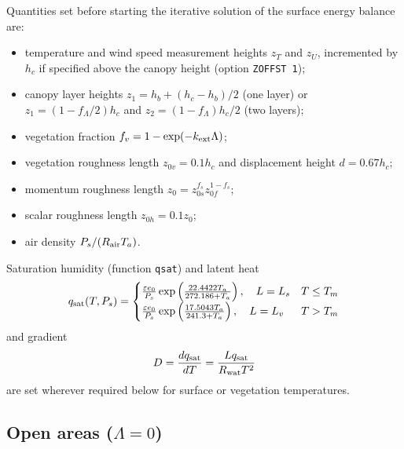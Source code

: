 \documentclass[fleqn]{article}
\begin{document}
Quantities set before starting the iterative solution of the surface energy balance are:
\begin{itemize}[leftmargin=*]
\item temperature and wind speed measurement heights $z_T$ and $z_U$, incremented by $h_c$ if specified above the canopy height (option {\tt ZOFFST 1});
\item canopy layer heights $z_1 = h_b + (h_c-h_b)/2$ (one layer) or $z_1 = (1 - f_\Lambda/2)h_c$ and $z_2 = (1 - f_\Lambda)h_c/2$ (two layers);
\item vegetation fraction $f_v = 1 - \exp(-k_{\rm ext}\Lambda)$;
\item vegetation roughness length $z_{0v} = 0.1h_c$ and displacement height $d = 0.67h_c$; 
\item momentum roughness length $z_0 = z_{0s}^{f_s}z_{0f}^{1-f_s}$;
\item scalar roughness length $z_{0h} = 0.1z_0$;
\item air density $P_s/(R_{\rm air}T_a)$.
\end{itemize}
Saturation humidity (function {\tt qsat}) and latent heat
\begin{equation}
q_{\rm sat}(T,P_s) = 
\begin{cases}
     \frac{\varepsilon e_0}{P_s}\exp\left(\frac{22.4422T_a}{272.186 + T_a}\right), \quad L = L_s   & T \leq T_m \\
     \frac{\varepsilon e_0}{P_s}\exp\left(\frac{17.5043T_a}{241.3 + T_a}\right), \quad L = L_v  & T > T_m  \\
\end{cases}
\end{equation}
and gradient 
\begin{equation}
D = \frac{dq_{\rm sat}}{dT} = \frac{Lq_{\rm sat}}{R_{\rm wat}T^2}
\end{equation}
are set wherever required below for surface or vegetation temperatures.

\subsection{Open areas ($\Lambda = 0$)}
\end{document}
